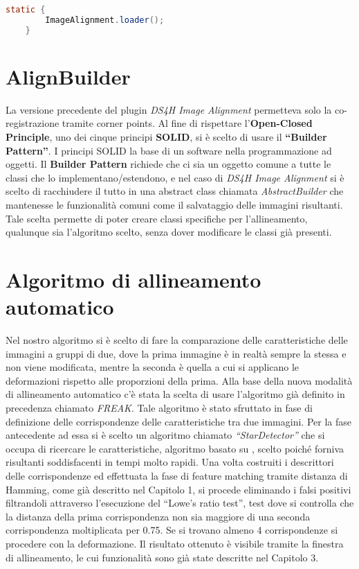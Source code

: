 \begin{minipage}{\linewidth}
\begin{lstlisting}[language=Java,label={lst:static-call}, caption={Esempio di static block proveniente dal nostro caso di studio}]
    static {
        ImageAlignment.loader();
    }
\end{lstlisting}
\end{minipage}

\section{AlignBuilder}
\noindent La versione precedente del plugin \textit{DS4H Image Alignment} permetteva solo la co-registrazione tramite corner points. Al fine di rispettare l'\textbf{Open-Closed Principle}, uno dei cinque principi \textbf{SOLID}, si è scelto di usare il \textbf{``Builder Pattern''}. I principi SOLID la base di un software nella programmazione ad oggetti. Il \textbf{Builder Pattern} richiede che ci sia un oggetto comune a tutte le classi che lo implementano/estendono, e nel caso di \textit{DS4H Image Alignment} si è scelto di racchiudere il tutto in una abstract class chiamata \textit{AbstractBuilder} che mantenesse le funzionalità comuni come il salvataggio delle immagini risultanti. Tale scelta permette di poter creare classi specifiche per l'allineamento, qualunque sia l'algoritmo scelto, senza dover modificare le classi già presenti.

\section{Algoritmo di allineamento automatico}
\noindent Nel nostro algoritmo si è scelto di fare la comparazione delle caratteristiche delle immagini a gruppi di due, dove la prima immagine è in realtà sempre la stessa e non viene modificata, mentre la seconda è quella a cui si applicano le deformazioni rispetto alle proporzioni della prima. Alla base della nuova modalità di allineamento automatico c'è stata la scelta di usare l'algoritmo già definito in precedenza chiamato \textit{FREAK}. Tale algoritmo è stato sfruttato in fase di definizione delle corrispondenze delle caratteristiche tra due immagini. Per la fase antecedente ad essa si è scelto un algoritmo chiamato \textit{``StarDetector''} che si occupa di ricercare le caratteristiche, algoritmo basato su \cite{10.1007/978-3-540-88693-8_8}, scelto poiché forniva risultanti soddisfacenti in tempi molto rapidi. Una volta costruiti i descrittori delle corrispondenze ed effettuata la fase di feature matching tramite distanza di Hamming, come già descritto nel Capitolo 1, si procede eliminando i falsi positivi filtrandoli attraverso l'esecuzione del ``Lowe's ratio test'', test dove si controlla che la distanza della prima corrispondenza non sia maggiore di una seconda corrispondenza moltiplicata per 0.75. Se si trovano almeno 4 corrispondenze si procedere con la deformazione. Il risultato ottenuto è visibile tramite la finestra di allineamento, le cui funzionalità sono già state descritte nel Capitolo 3. 

